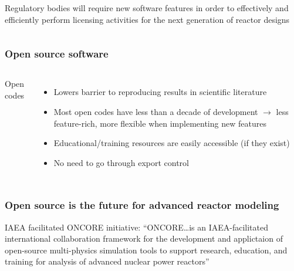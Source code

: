 \begin{frame}
\begin{columns}
        \column[t]{5cm}
        Regulatory bodies will require new software features in order to effectively and efficiently perform licensing activities for the next generation of reactor designs\cite{usnrc_nonlwr_2020-1}
    \end{columns}

\end{frame}

\begin{frame}
    \frametitle{Open source software}
    \begin{columns}
        \column[t]{5cm}
        Open codes
        \begin{itemize}
            \item Lowers barrier to reproducing results in scientific literature
            \item Most open codes have less than a decade of development $\rightarrow$ less feature-rich, more flexible when implementing new features
            \item Educational/training resources are easily accessible (if they exist)
            \item No need to go through export control
        \end{itemize}

        \column[t]{5cm}

    \end{columns}

\end{frame}

\begin{frame}
    \frametitle{Open source is the future for advanced reactor modeling}
    \Gls{IAEA} facilitated \Gls{ONCORE} initiative\cite{fiorina_initiative_2021}:
    \newline
    \newline
    \noindent ``ONCORE\ldots is an IAEA-facilitated international collaboration framework for the development and applictaion of open-source multi-physics simulation tools to support research, education, and training for analysis of advanced nuclear power reactors''\cite{iaea_open-source}

\end{frame}

